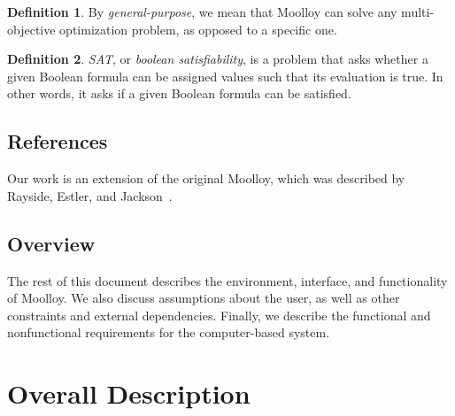 \documentclass[11pt]{article}
\theoremstyle{definition}
\newtheorem{mydef}{Definition}
\begin{document}
\begin{mydef}
By \textit{general-purpose}, we mean that Moolloy can solve any
multi-objective optimization problem, as opposed to a specific one.
\end{mydef}

\begin{mydef}
\textit{SAT}, or \textit{boolean satisfiability}, is a problem that
asks whether a given Boolean formula can be assigned values such that
its evaluation is true. In other words, it asks if a given Boolean
formula can be satisfied.
\end{mydef}

\subsection{References}\label{sec:ref}

Our work is an extension of the original Moolloy, which was described
by Rayside, Estler, and Jackson~\cite{ref:Rayside09}.

\subsection{Overview}\label{sec:overview}

The rest of this document describes the environment, interface, and
functionality of Moolloy. We also discuss assumptions about the user,
as well as other constraints and external dependencies. Finally, we
describe the functional and nonfunctional requirements for the
computer-based system.

\section{Overall Description}\label{sec:overall_desc}
\end{document}
